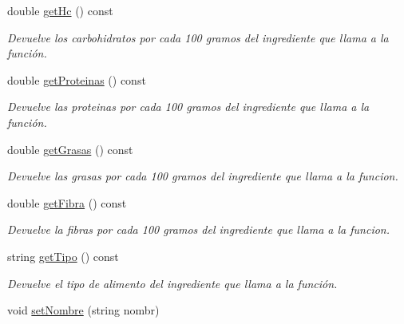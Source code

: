 \begin{DoxyCompactItemize}
double \hyperlink{classingrediente_ae51c33e37001b7807a7b2d7bd7352355}{get\+Hc} () const
\begin{DoxyCompactList}\small\item\em Devuelve los carbohidratos por cada 100 gramos del ingrediente que llama a la función. \end{DoxyCompactList}\item 
\mbox{\label{classingrediente_a2506bbdfd9accd7247d1734838713d73}} 
double \hyperlink{classingrediente_a2506bbdfd9accd7247d1734838713d73}{get\+Proteinas} () const
\begin{DoxyCompactList}\small\item\em Devuelve las proteinas por cada 100 gramos del ingrediente que llama a la función. \end{DoxyCompactList}\item 
\mbox{\label{classingrediente_af4639a93a991a37158d137d438db84fc}} 
double \hyperlink{classingrediente_af4639a93a991a37158d137d438db84fc}{get\+Grasas} () const
\begin{DoxyCompactList}\small\item\em Devuelve las grasas por cada 100 gramos del ingrediente que llama a la funcion. \end{DoxyCompactList}\item 
\mbox{\label{classingrediente_a7abcffbf8f3a03861183514216125849}} 
double \hyperlink{classingrediente_a7abcffbf8f3a03861183514216125849}{get\+Fibra} () const
\begin{DoxyCompactList}\small\item\em Devuelve la fibras por cada 100 gramos del ingrediente que llama a la funcion. \end{DoxyCompactList}\item 
\mbox{\label{classingrediente_a03334e887add1dbdc7991de77234ede7}} 
string \hyperlink{classingrediente_a03334e887add1dbdc7991de77234ede7}{get\+Tipo} () const
\begin{DoxyCompactList}\small\item\em Devuelve el tipo de alimento del ingrediente que llama a la función. \end{DoxyCompactList}\item 
void \hyperlink{classingrediente_a9603dba8fc6427d230996396bd6421c4}{set\+Nombre} (string nombr)

\end{DoxyCompactItemize}
